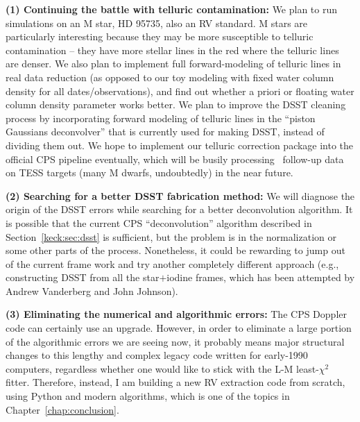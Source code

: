 {\bf (1) Continuing the battle with telluric contamination: } We plan
to run simulations on an M star, HD 95735, also an RV standard. M stars
are particularly interesting because they may be more susceptible to
telluric contamination -- they have more stellar lines in the red
where the telluric lines are denser. We also plan to implement full
forward-modeling of telluric lines in real data reduction (as opposed
to our toy modeling with fixed water column density for all
dates/observations), and find out whether a priori or floating water
column density parameter works better. We plan to improve the DSST
cleaning process by incorporating forward modeling of telluric lines
in the ``piston Gaussians deconvolver'' that is currently used for
making DSST, instead of dividing them out. We hope to implement our
telluric correction package into the official CPS pipeline eventually,
which will be busily processing \keck\ follow-up data on TESS targets
(many M dwarfs, undoubtedly) in the near future.

{\bf (2) Searching for a better DSST fabrication method: } We will
diagnose the origin of the DSST errors while searching for a better
deconvolution algorithm. It is possible that the current CPS
``deconvolution'' algorithm described in Section~\ref{keck:sec:dsst}
is sufficient, but the problem is in the normalization or some other
parts of the process. Nonetheless, it could be rewarding to jump out
of the current frame work and try another completely different
approach (e.g., constructing DSST from all the star$+$iodine frames,
which has been attempted by Andrew Vanderberg and John Johnson).

{\bf (3) Eliminating the numerical and algorithmic errors: } The CPS
Doppler code can certainly use an upgrade. However, in order to
eliminate a large portion of the algorithmic errors we are seeing now,
it probably means major structural changes to this lengthy and complex
legacy code written for early-1990 computers, regardless whether one
would like to stick with the L-M least-$\chi^2$ fitter. Therefore,
instead, I am building a new RV extraction code from scratch, using
Python and modern algorithms, which is one of the topics in
Chapter~\ref{chap:conclusion}.



